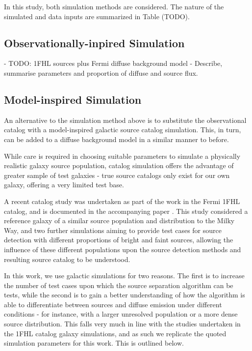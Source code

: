 \documentclass{PoS}
\begin{document}
In this study, both simulation methods are considered. The nature of the simulated and data inputs are summarized in Table (TODO).


\subsection{Observationally-inpired Simulation}
- TODO: 1FHL sources plus Fermi diffuse background model
- Describe, summarise parameters and proportion of diffuse and source flux.

\subsection{Model-inspired Simulation}

An alternative to the simulation method above is to substitute the observational catalog with a model-inspired galactic source catalog simulation. This, in turn, can be added to a diffuse background model in a similar manner to before.

While care is required in choosing suitable parameters to simulate a physically realistic galaxy source population, catalog simulation offers the advantage of greater sample of test galaxies - true source catalogs only exist for our own galaxy, offering a very limited test base.

A recent catalog study was undertaken as part of the work in the Fermi 1FHL catalog, and is documented in the accompanying paper \cite{1fhl}. This study considered a reference galaxy of a similar source population and distribution to the Milky Way, and two further simulations aiming to provide test cases for source detection with different proportions of bright and faint sources, allowing the influence of these different populations upon the source detection methods and resulting source catalog to be understood. 

In this work, we use galactic simulations for two reasons. The first is to increase the number of test cases upon which the source separation algorithm can be tests, while the second is to gain a better understanding of how the algorithm is able to differentiate between sources and diffuse emission under different conditions - for instance, with a larger unresolved population or a more dense source distribution. This falls very much in line with the studies undertaken in the 1FHL catalog galaxy simulations, and as such we replicate the quoted simulation parameters \cite[p.59]{1fhl} for this work. This is outlined below.
\end{document}
